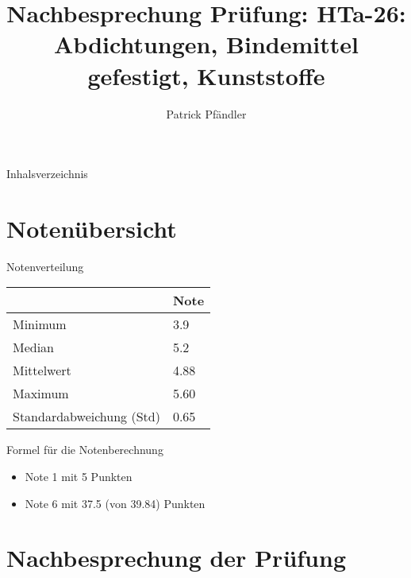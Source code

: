 \def\customoptions{aspectratio=169} %

\usepackage{fontawesome}  %


\title{\textbf{Nachbesprechung Prüfung: HTa-26: Abdichtungen, Bindemittel gefestigt, Kunststoffe}
}
\author{Patrick Pfändler}




\frame{\titlepage}

\begin{frame}{Inhalsverzeichnis}
    \tableofcontents
\end{frame}


\section{Notenübersicht}
\begin{frame}{Notenverteilung}
    \begin{table}[h!]
        \centering
        \label{tab:statistische_werte}
        \begin{tabular}{ll}
            \hline
            \textbf{{}} & \textbf{Note} \\ \hline
            Minimum & 3.9 \\
            Median & 5.2 \\
            Mittelwert & 4.88 \\
            Maximum & 5.60 \\
            Standardabweichung (Std) & 0.65 \\ \hline
        \end{tabular}
    \end{table}
\end{frame}

\begin{frame}{Formel für die Notenberechnung}
    \begin{itemize}
        \item[\textbullet] Note 1 mit 5 Punkten
        \item[\textbullet] Note 6 mit 37.5 (von 39.84) Punkten  
    \end{itemize}
\end{frame}

\section{Nachbesprechung der Prüfung}

